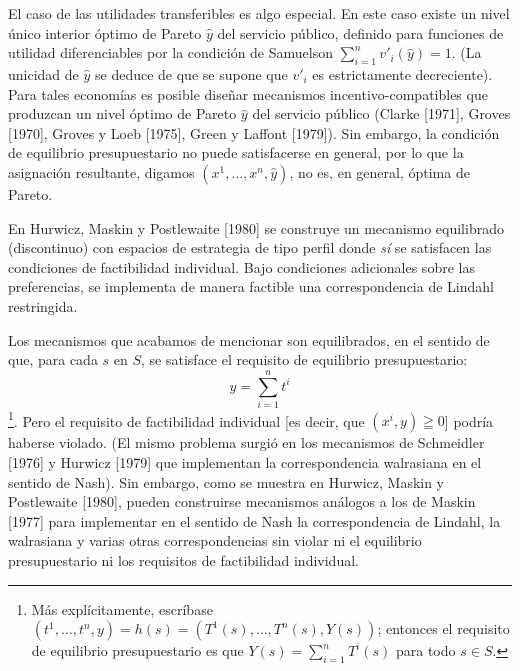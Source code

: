 \documentclass[12pt, letterpaper]{article}
\begin{document}
El caso de las utilidades transferibles es algo especial. En este caso existe un nivel único interior óptimo de Pareto $\hat{y}$ del servicio público, definido para funciones de utilidad diferenciables por la condición de Samuelson $\sum_{i=1}^n v'_i(\hat{y}) = 1$. (La unicidad de $\hat{y}$ se deduce de que se supone que $v'_i$ es estrictamente decreciente). Para tales economías es posible diseñar mecanismos incentivo-compatibles que produzcan un nivel óptimo de Pareto $\hat{y}$ del servicio público (Clarke [1971], Groves [1970], Groves y Loeb [1975], Green y Laffont [1979]). Sin embargo, la condición de equilibrio presupuestario no puede satisfacerse en general, por lo que la asignación resultante, digamos $(x^1, \dots, x^n, \hat{y})$, no es, en general, óptima de Pareto.

En Hurwicz, Maskin y Postlewaite [1980] se construye un mecanismo equilibrado (discontinuo) con espacios de estrategia de tipo perfil donde \textit{sí} se satisfacen las condiciones de factibilidad individual. Bajo condiciones adicionales sobre las preferencias, se implementa de manera factible una correspondencia de Lindahl restringida.

Los mecanismos que acabamos de mencionar son equilibrados, en el sentido de que, para cada $s$ en $S$, se satisface el requisito de equilibrio presupuestario:
\[
y = \sum_{i=1}^{n} t^i
\]
\footnote{Más explícitamente, escríbase $(t^1, \dots, t^n, y) = h(s) = (T^1(s), \dots, T^n(s), Y(s))$; entonces el requisito de equilibrio presupuestario es que $Y(s) = \sum_{i=1}^n T^i(s)$ para todo $s \in S$.}. Pero el requisito de factibilidad individual [es decir, que $(x^i, y) \geqq 0$] podría haberse violado. (El mismo problema surgió en los mecanismos de Schmeidler [1976] y Hurwicz [1979] que implementan la correspondencia walrasiana en el sentido de Nash). Sin embargo, como se muestra en Hurwicz, Maskin y Postlewaite [1980], pueden construirse mecanismos análogos a los de Maskin [1977] para implementar en el sentido de Nash la correspondencia de Lindahl, la walrasiana y varias otras correspondencias sin violar ni el equilibrio presupuestario ni los requisitos de factibilidad individual.
\end{document}
